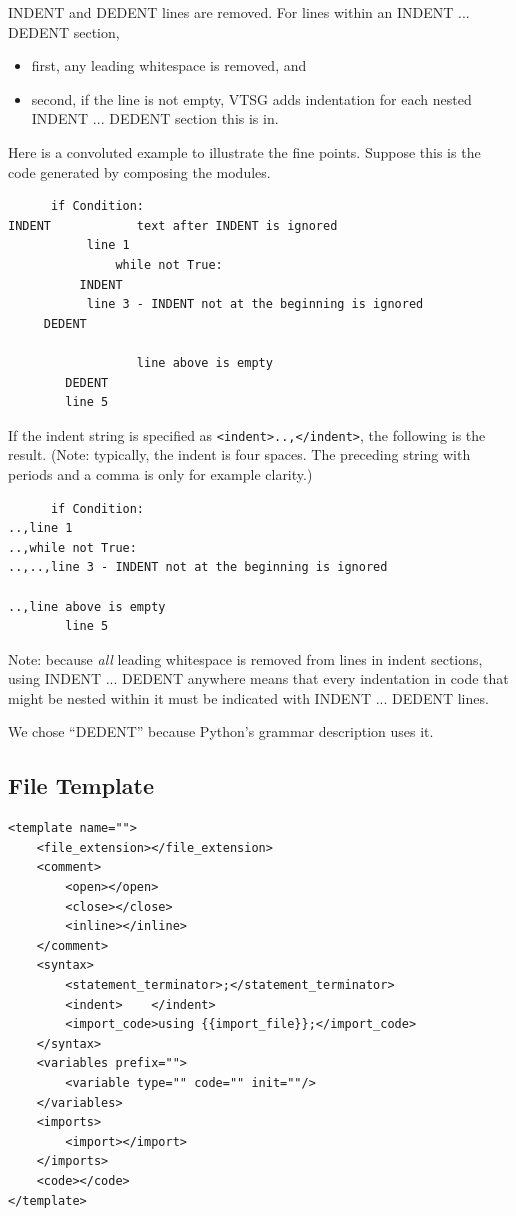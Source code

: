 INDENT and DEDENT lines are removed.
For lines within an INDENT ... DEDENT section,
\begin{itemize}[nosep]
\item first, any leading whitespace is removed, and
\item second, if the line is not empty, VTSG adds indentation for each nested
  INDENT ... DEDENT section this is in.
\end{itemize}

Here is a convoluted example to illustrate the fine points.  Suppose this is the
code generated by composing the modules.
\begin{verbatim}
      if Condition:
INDENT            text after INDENT is ignored
           line 1
               while not True:
          INDENT
           line 3 - INDENT not at the beginning is ignored
     DEDENT

                  line above is empty
        DEDENT
        line 5
\end{verbatim}
If the indent string is specified as \verb|<indent>..,</indent>|, the following is
the result. (Note: typically, the indent is four spaces. The preceding string with
periods and a comma is only for example clarity.)
\begin{verbatim}
      if Condition:
..,line 1
..,while not True:
..,..,line 3 - INDENT not at the beginning is ignored

..,line above is empty
        line 5
\end{verbatim}

Note: because \emph{all} leading whitespace is removed from lines in indent sections,
using INDENT ... DEDENT anywhere means that every indentation in code that might be
nested within it must be indicated
with INDENT ... DEDENT lines.

We chose ``DEDENT'' because Python's grammar description uses it.


\subsection{File Template}
\label{sec: file template}

\begin{verbatim}
<template name="">
    <file_extension></file_extension>
    <comment>
        <open></open>
        <close></close>
        <inline></inline>
    </comment>
    <syntax>
        <statement_terminator>;</statement_terminator>
        <indent>    </indent>
        <import_code>using {{import_file}};</import_code>
    </syntax>
    <variables prefix="">
        <variable type="" code="" init=""/>
    </variables>
    <imports>
        <import></import>
    </imports>
    <code></code>
</template>
\end{verbatim}

